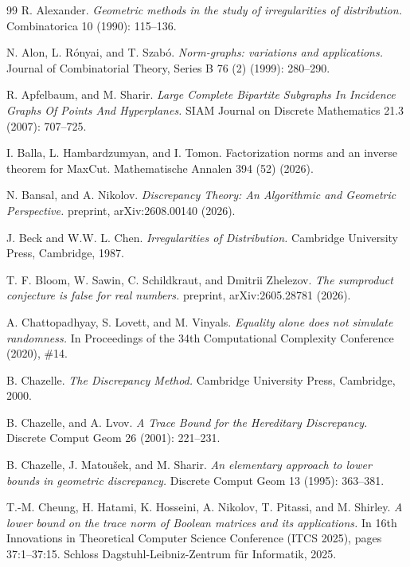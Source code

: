 \documentclass[11pt]{article}
\theoremstyle{plain}
\theoremstyle{definition}
\begin{document}
	\begin{thebibliography}{99}
		R. Alexander.
		\emph{Geometric methods in the study of irregularities of distribution.} Combinatorica 10 (1990): 115--136.
		
		N. Alon, L. R\'onyai, and T. Szab\'o.
		\emph{Norm-graphs: variations and applications.}
		Journal of Combinatorial Theory, Series B 76 (2) (1999): 280--290.
		
		R. Apfelbaum, and M. Sharir. 
		\emph{Large Complete Bipartite Subgraphs In Incidence Graphs Of
			Points And Hyperplanes.}
		SIAM Journal on Discrete Mathematics 21.3 (2007): 707--725.
		
		I. Balla, L. Hambardzumyan, and I. Tomon. Factorization norms and an inverse theorem for MaxCut. Mathematische Annalen 394 (52) (2026).

        N. Bansal, and A. Nikolov.
        \emph{Discrepancy Theory: An Algorithmic and Geometric Perspective.}
        preprint, arXiv:2608.00140 (2026).
		
		J. Beck and W.W. L. Chen.
		\emph{Irregularities of Distribution.}
		Cambridge University Press, Cambridge, 1987.
		
		T. F. Bloom, W. Sawin, C. Schildkraut, and Dmitrii Zhelezov. 
		\emph{The sumproduct conjecture is false for real numbers.}
		preprint, arXiv:2605.28781 (2026).
		
		A. Chattopadhyay, S. Lovett, and M. Vinyals.
		\emph{Equality alone does not simulate randomness.}
		In Proceedings of the 34th Computational Complexity Conference (2020), \#14.
		
		B. Chazelle.
		\emph{The Discrepancy Method.}
		Cambridge University Press, Cambridge, 2000.
		
		
		B. Chazelle, and A. Lvov.
		\emph{A Trace Bound for the Hereditary Discrepancy.}
		Discrete Comput Geom 26 (2001): 221--231.
		
		B. Chazelle, J. Matou\v{s}ek, and M. Sharir.
		\emph{An elementary approach to lower bounds in geometric discrepancy.}
		Discrete Comput Geom 13 (1995): 363--381.
		
		T.-M. Cheung, H. Hatami, K. Hosseini, A. Nikolov, T. Pitassi, and M. Shirley. 
		\emph{A lower bound on the trace norm of Boolean matrices and its applications.} In 16th Innovations in Theoretical Computer Science
		Conference (ITCS 2025), pages 37:1--37:15. Schloss Dagstuhl-Leibniz-Zentrum f\"ur Informatik, 2025.
		

\end{thebibliography}
\end{document}

